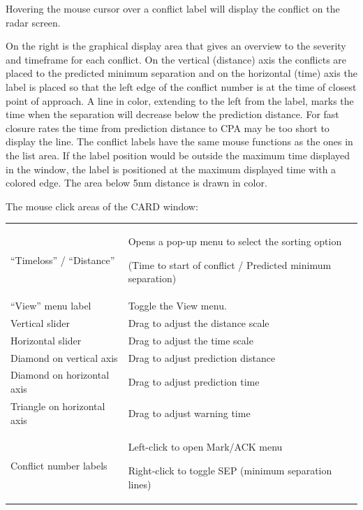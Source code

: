 \documentclass[a4paper,oneside,11pt]{memoir}
\begin{document}
\bigskip

Hovering the mouse cursor over a conflict label will display the conflict on the radar screen.

\bigskip

On the right is the graphical display area that gives an overview to the severity and timeframe for each conflict. On the vertical (distance) axis the conflicts are placed to the predicted minimum separation and on the horizontal (time) axis the label is placed so that the left edge of the conflict number is at the time of closest point of approach. A line in  color, extending to the left from the label, marks the time when the separation will decrease below the prediction distance. For fast closure rates the time from prediction distance to CPA may be too short to display the line. The conflict labels have the same mouse functions as the ones in the list area. If the label position would be outside the maximum time displayed in the window, the label is positioned at the maximum displayed time with a  colored edge.
The area below 5nm distance is drawn in  color.

\bigskip

The mouse click areas of the CARD window:

\bigskip

\begin{longtable}{p{5.5cm} p{7cm}}
    “Timeloss” / “Distance”     & Opens a pop-up menu to select the sorting option
                                  
                                  (Time to start of conflict / Predicted minimum separation)\\
    “View” menu label           & Toggle the View menu.\\
    Vertical slider             & Drag to adjust the distance scale\\
    Horizontal slider           & Drag to adjust the time scale\\
    Diamond on vertical axis    & Drag to adjust prediction distance    \\
    Diamond on horizontal axis  & Drag to adjust prediction time\\
    Triangle on horizontal axis & Drag to adjust warning time\\
    Conflict number labels      & Left-click to open Mark/ACK menu
                                  
                                  Right-click to toggle SEP (minimum separation lines)\\
\end{longtable}
\end{document}
